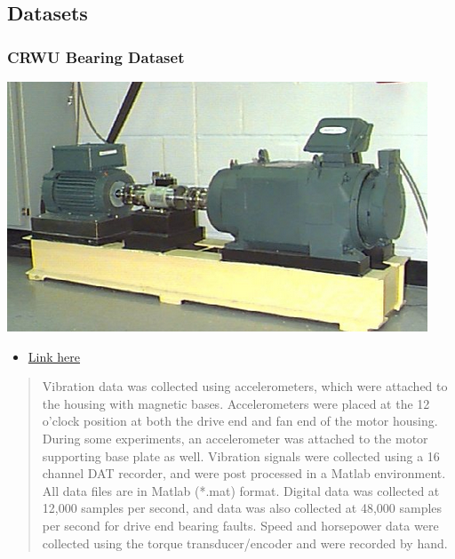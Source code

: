 \documentclass[
  letterpaper,
  DIV=11,
  numbers=noendperiod]{scrartcl}
\providecommand{\tightlist}{%
  \setlength{\itemsep}{0pt}\setlength{\parskip}{0pt}}\usepackage{longtable,booktabs,array}
\begin{document}
\hypertarget{datasets}{%
\subsection{Datasets}\label{datasets}}

\hypertarget{crwu-bearing-dataset}{%
\subsubsection{CRWU Bearing Dataset}\label{crwu-bearing-dataset}}

\includegraphics{img/2023-01-08-19-36-39.png}

\begin{itemize}
\tightlist
\item
  \href{https://engineering.case.edu/bearingdatacenter/download-data-file}{Link
  here}
\end{itemize}

\begin{quote}
Vibration data was collected using accelerometers, which were attached
to the housing with magnetic bases. Accelerometers were placed at the 12
o'clock position at both the drive end and fan end of the motor housing.
During some experiments, an accelerometer was attached to the motor
supporting base plate as well. Vibration signals were collected using a
16 channel DAT recorder, and were post processed in a Matlab
environment. All data files are in Matlab (*.mat) format. Digital data
was collected at 12,000 samples per second, and data was also collected
at 48,000 samples per second for drive end bearing faults. Speed and
horsepower data were collected using the torque transducer/encoder and
were recorded by hand.
\end{quote}
\end{document}
